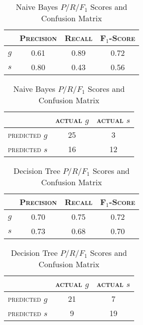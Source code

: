 \begin{table}[ht]
\begin{minipage}[b]{0.45\linewidth}\centering
\begin{tabular}{ c | c  c  c }
	& \textsc{Precision} & \textsc{Recall} & \textsc{F$_1$-Score} \\
	\hline
	\textsc{$g$} 	& 0.61 & 0.89 & 0.72 \\
	\textsc{$s$}	& 0.80 & 0.43 & 0.56
\end{tabular}
\end{minipage}
\hspace{0.5cm}
\begin{minipage}[b]{0.45\linewidth}
\centering
\begin{tabular}{ c | c  c }
	 & \textsc{actual $g$} & \textsc{actual $s$} \\
	\hline
	\textsc{predicted $g$} 	& 25 & 3 \\
	\textsc{predicted $s$}		& 16 & 12
\end{tabular}
\end{minipage}
\caption{Naive Bayes $P/R/F_1$ Scores and Confusion Matrix}
\end{table}

\begin{table}[ht]
\begin{minipage}[b]{0.45\linewidth}\centering
\begin{tabular}{ c | c  c  c }
	& \textsc{Precision} & \textsc{Recall} & \textsc{F$_1$-Score} \\
	\hline
	\textsc{$g$} 	& 0.70 & 0.75 & 0.72 \\
	\textsc{$s$}	& 0.73 & 0.68 & 0.70
\end{tabular}
\end{minipage}
\hspace{0.5cm}
\begin{minipage}[b]{0.45\linewidth}
\centering
\begin{tabular}{ c | c  c }
	 & \textsc{actual $g$} & \textsc{actual $s$} \\
	\hline
	\textsc{predicted $g$} 	& 21 & 7 \\
	\textsc{predicted $s$}		& 9 & 19
\end{tabular}
\end{minipage}
\caption{Decision Tree $P/R/F_1$ Scores and Confusion Matrix}
\end{table}
\newpage

